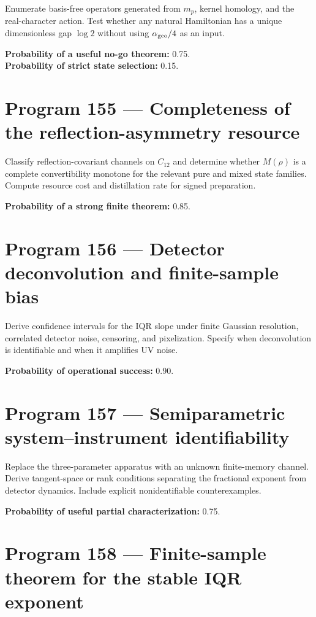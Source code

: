 \documentclass[11pt,a4paper,openany]{report}
\begin{document}
Enumerate basis-free operators generated from \(m_p\), kernel homology, and the real-character action. Test whether any natural Hamiltonian has a unique dimensionless gap \(\log2\) without using \(\alpha_{\rm geo}/4\) as an input.

\textbf{Probability of a useful no-go theorem:} 0.75.\\
\textbf{Probability of strict state selection:} 0.15.

\section{Program 155 --- Completeness of the reflection-asymmetry resource}

Classify reflection-covariant channels on \(C_{12}\) and determine whether \(M(\rho)\) is a complete convertibility monotone for the relevant pure and mixed state families. Compute resource cost and distillation rate for signed preparation.

\textbf{Probability of a strong finite theorem:} 0.85.

\section{Program 156 --- Detector deconvolution and finite-sample bias}

Derive confidence intervals for the IQR slope under finite Gaussian resolution, correlated detector noise, censoring, and pixelization. Specify when deconvolution is identifiable and when it amplifies UV noise.

\textbf{Probability of operational success:} 0.90.

\section{Program 157 --- Semiparametric system--instrument identifiability}

Replace the three-parameter apparatus with an unknown finite-memory channel. Derive tangent-space or rank conditions separating the fractional exponent from detector dynamics. Include explicit nonidentifiable counterexamples.

\textbf{Probability of useful partial characterization:} 0.75.

\section{Program 158 --- Finite-sample theorem for the stable IQR exponent}
\end{document}
